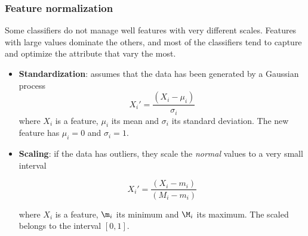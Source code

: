 \subsubsection*{Feature normalization}

Some classifiers do not manage well features with very different scales. Features with large values dominate the others, and most of the classifiers tend to capture and optimize the attribute that vary the most.

\begin{itemize}
\item \textbf{Standardization}: assumes that the data has been generated by a Gaussian process 
$$X_i' = \frac{(X_i - \mu_i)}{\sigma_i}$$
where $X_i$ is a feature, $\mu_i$ its mean and $\sigma_i$ its standard deviation. The new feature has $\mu_i = 0$ and $\sigma_i = 1$.

\item \textbf{Scaling}: if the data has outliers, they scale the \emph{normal} values to a very small interval

$$X_i' = \frac{(X_i - m_i)}{(M_i - m_i)}$$

where $X_i$ is a feature, $\m_i$ its minimum and $\M_i$ its maximum. The scaled belongs to the interval $[0,1]$.

\end{itemize}

 




